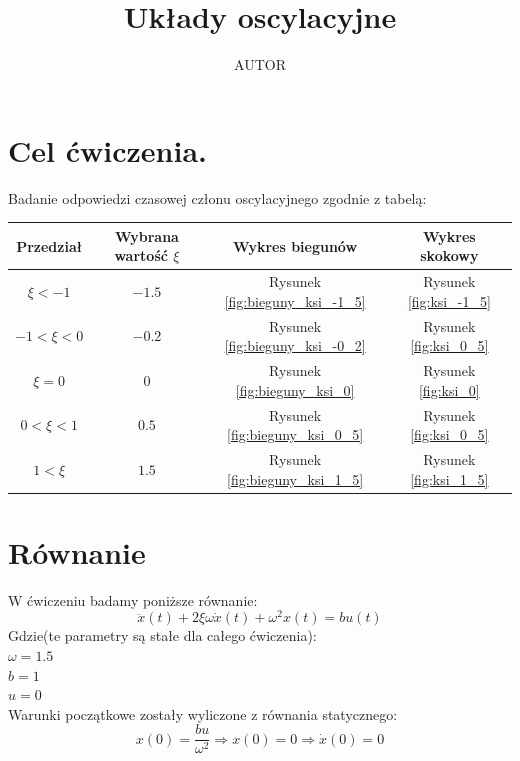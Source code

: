 \documentclass{article}
\title{Układy oscylacyjne}
\author{AUTOR}
\date{}
\begin{document}
\maketitle

\section{Cel ćwiczenia.}




Badanie odpowiedzi czasowej członu oscylacyjnego zgodnie z tabelą:
\begin{center}
\begin{tabular}{ |c|c|c|c| }
    \hline
    Przedział & Wybrana wartość $\xi$ & Wykres biegunów & Wykres skokowy \\ 
    \hline
    $\xi<-1$    & $-1.5$ & Rysunek \ref{fig:bieguny_ksi_-1_5}   & Rysunek \ref{fig:ksi_-1_5}\\
    \hline
    $-1<\xi<0$  & $-0.2$ & Rysunek \ref{fig:bieguny_ksi_-0_2}   & Rysunek \ref{fig:ksi_0_5}\\ 
    \hline
    $\xi=0$     & $0$    & Rysunek \ref{fig:bieguny_ksi_0}      & Rysunek \ref{fig:ksi_0}\\ 
    \hline
    $0<\xi<1$   & $0.5$  & Rysunek \ref{fig:bieguny_ksi_0_5}    & Rysunek \ref{fig:ksi_0_5}\\ 
    \hline
    $1<\xi$     & $1.5$  & Rysunek \ref{fig:bieguny_ksi_1_5}    & Rysunek \ref{fig:ksi_1_5}\\ 
    \hline
\end{tabular}

\end{center}

\section{Równanie}
W ćwiczeniu badamy poniższe równanie: 
$$
\ddot{x}(t)+2\xi \omega \dot{x}(t)+ \omega^{2}x(t) = bu(t)
$$
Gdzie(te parametry są stałe dla całego ćwiczenia):\\
$\omega = 1.5$\\
$b = 1$\\
$u = 0$\\
Warunki początkowe zostały wyliczone z równania statycznego:\\
$$
x(0)=\frac{bu}{\omega^2} \Rightarrow x(0)=0
\Rightarrow
\dot{x}(0)=0
$$
\newpage
\end{document}
